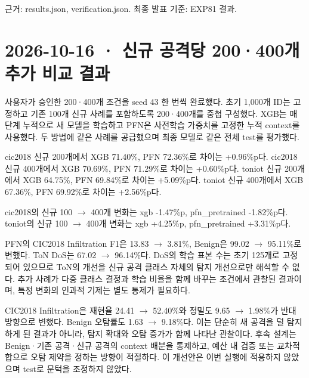 근거: results.json, verification.json. 최종 발표 기준: EXP81 결과.



\section{2026-10-16 · 신규 공격당 200·400개 추가 비교 결과}
\label{report:20261016_exp80_results}
사용자가 승인한 200·400개 조건을 seed 43 한 번씩 완료했다. 초기 1,000개 ID는 고정하고 기존 100개 신규 사례를 포함하도록 200·400개를 중첩 구성했다. XGB는 매 단계 누적으로 새 모델을 학습하고 PFN은 사전학습 가중치를 고정한 누적 context를 사용했다. 두 방법에 같은 사례를 공급했으며 최종 모델로 같은 전체 test를 평가했다.

cic2018 신규 200개에서 XGB 71.40\%, PFN 72.36\%로 차이는 +\allowbreak{}0.96\%p다. cic2018 신규 400개에서 XGB 70.69\%, PFN 71.29\%로 차이는 +\allowbreak{}0.60\%p다. toniot 신규 200개에서 XGB 64.75\%, PFN 69.84\%로 차이는 +\allowbreak{}5.09\%p다. toniot 신규 400개에서 XGB 67.36\%, PFN 69.92\%로 차이는 +\allowbreak{}2.56\%p다.

cic2018의 신규 100 \ensuremath{\rightarrow} 400개 변화는 xgb -1.47\%p, pfn\_\allowbreak{}pretrained -1.82\%p다. toniot의 신규 100 \ensuremath{\rightarrow} 400개 변화는 xgb +\allowbreak{}4.25\%p, pfn\_\allowbreak{}pretrained +\allowbreak{}3.31\%p다.

PFN의 CIC2018 Infiltration F1은 13.83 \ensuremath{\rightarrow} 3.81\%, Benign은 99.02 \ensuremath{\rightarrow} 95.11\%로 변했다. ToN DoS는 67.02 \ensuremath{\rightarrow} 96.14\%다. DoS의 학습 표본 수는 초기 125개로 고정되어 있으므로 ToN의 개선을 신규 공격 클래스 자체의 탐지 개선으로만 해석할 수 없다. 추가 사례가 다중 클래스 결정과 학습 비율을 함께 바꾸는 조건에서 관찰된 결과이며, 특정 변화의 인과적 기제는 별도 통제가 필요하다.

CIC2018 Infiltration은 재현율 24.41 \ensuremath{\rightarrow} 52.40\%와 정밀도 9.65 \ensuremath{\rightarrow} 1.98\%가 반대 방향으로 변했다. Benign 오탐률도 1.63 \ensuremath{\rightarrow} 9.18\%다. 이는 단순히 새 공격을 덜 탐지하게 된 결과가 아니라, 탐지 확대와 오탐 증가가 함께 나타난 관찰이다. 후속 설계는 Benign·기존 공격·신규 공격의 context 배분을 통제하고, 예산 내 검증 또는 교차적합으로 오탐 제약을 정하는 방향이 적절하다. 이 개선안은 이번 실행에 적용하지 않았으며 test로 문턱을 조정하지 않았다.

